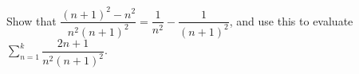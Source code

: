 Show that $\dfrac{(n+1)^2-n^2}{n^2(n+1)^2}=\dfrac1{n^2}-\dfrac1{(n+1)^2}$, and use this to evaluate $\sum_{n=1}^{k}\dfrac{2n+1}{n^2(n+1)^2}$.
